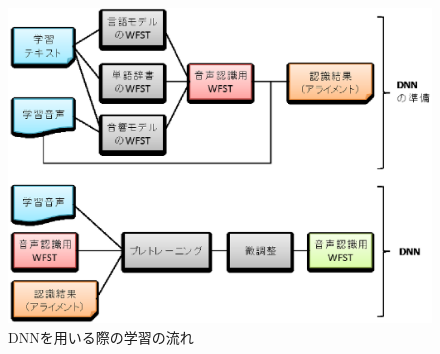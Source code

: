 \begin{figure}[H]
  \begin{center}
    \includegraphics{./figure/flow_train_dnn.eps}
  \end{center}
  \caption{DNNを用いる際の学習の流れ \label{fig:flow_train_dnn}}
\end{figure}


